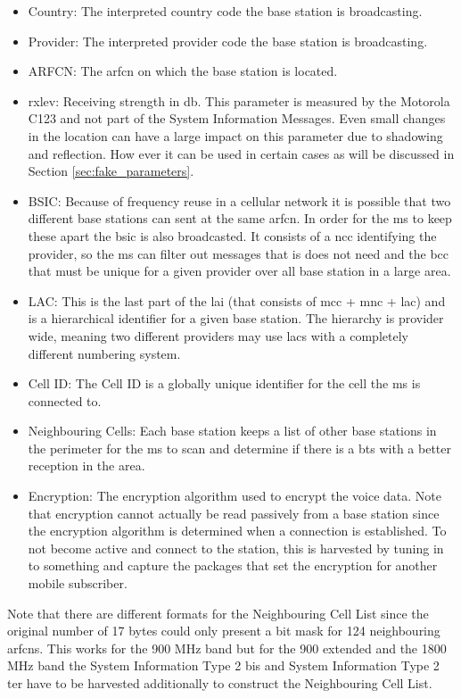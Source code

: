 \begin{itemize}
	\item Country: The interpreted country code the base station is broadcasting.
	\item Provider: The interpreted provider code the base station is broadcasting.
	\item ARFCN: The \gls{arfcn} on which the base station is located.
	\item rxlev: Receiving strength in db.
	This parameter is measured by the Motorola C123 and not part of the System Information Messages.
	Even small changes in the location can have a large impact on this parameter due to shadowing and reflection.
	How ever it can be used in certain cases as will be discussed in Section \ref{sec:fake_parameters}.
	\item BSIC: Because of frequency reuse in a cellular network it is possible that two different base stations can sent at the same \gls{arfcn}.
	In order for the \gls{ms} to keep these apart the \gls{bsic} is also broadcasted.
	It consists of a \gls{ncc} identifying the provider, so the \gls{ms} can filter out messages that is does not need and the \gls{bcc} that must be unique for a given provider over all base station in a large area.
	\item LAC: This is the last part of the \gls{lai} (that consists of \gls{mcc} + \gls{mnc} + \gls{lac}) and is a hierarchical identifier for a given base station.
	The hierarchy is provider wide, meaning two different providers may use \glspl{lac} with a completely different numbering system.
	\item Cell ID: The Cell ID is a globally unique identifier for the cell the \gls{ms} is connected to.
	\item Neighbouring Cells: Each base station keeps a list of other base stations in the perimeter  for the \gls{ms} to scan and determine if there is a \gls{bts} with a better reception in the area.
	\item Encryption: The encryption algorithm used to encrypt the voice data.
	Note that encryption cannot actually be read passively from a base station since the encryption algorithm is determined when a connection is established.
	To not become active and connect to the station, this is harvested by tuning in to something and capture the packages that set the encryption for another mobile subscriber.
\end{itemize}
Note that there are different formats for the Neighbouring Cell List since the original number of 17 bytes could only present a bit mask for 124 neighbouring \glspl{arfcn}.
This works for the 900 MHz band but for the 900 extended and the 1800 MHz band the System Information Type 2 bis and System Information Type 2 ter have to be harvested additionally to construct the Neighbouring Cell List.


